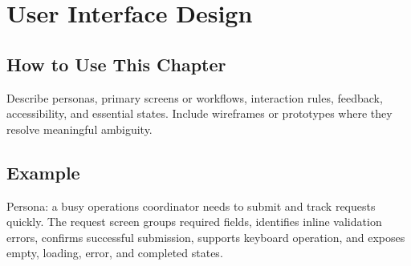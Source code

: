 \chapter{User Interface Design}
\section{How to Use This Chapter}
Describe personas, primary screens or workflows, interaction rules, feedback, accessibility, and essential states. Include wireframes or prototypes where they resolve meaningful ambiguity.
\section{Example}
Persona: a busy operations coordinator needs to submit and track requests quickly. The request screen groups required fields, identifies inline validation errors, confirms successful submission, supports keyboard operation, and exposes empty, loading, error, and completed states.
